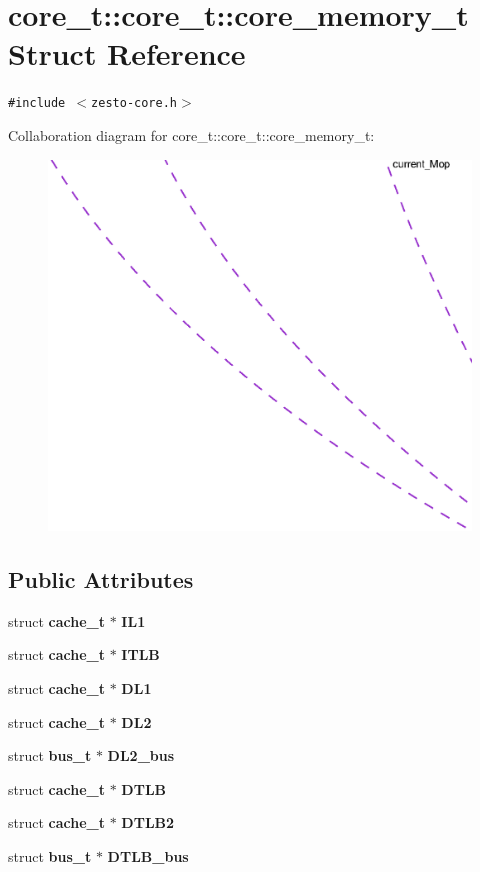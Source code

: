\section{core\_\-t::core\_\-t::core\_\-memory\_\-t Struct Reference}
\label{structcore__t_1_1core__memory__t}
{\tt \#include $<$zesto-core.h$>$}

Collaboration diagram for core\_\-t::core\_\-t::core\_\-memory\_\-t:\nopagebreak
\begin{figure}[H]
\begin{center}
\leavevmode
\includegraphics[width=400pt]{structcore__t_1_1core__memory__t__coll__graph}
\end{center}
\end{figure}
\subsection*{Public Attributes}
\begin{CompactItemize}
\item 
struct {\bf cache\_\-t} $\ast$ {\bf IL1}
\item 
struct {\bf cache\_\-t} $\ast$ {\bf ITLB}
\item 
struct {\bf cache\_\-t} $\ast$ {\bf DL1}
\item 
struct {\bf cache\_\-t} $\ast$ {\bf DL2}
\item 
struct {\bf bus\_\-t} $\ast$ {\bf DL2\_\-bus}
\item 
struct {\bf cache\_\-t} $\ast$ {\bf DTLB}
\item 
struct {\bf cache\_\-t} $\ast$ {\bf DTLB2}
\item 
struct {\bf bus\_\-t} $\ast$ {\bf DTLB\_\-bus}
\end{CompactItemize}


